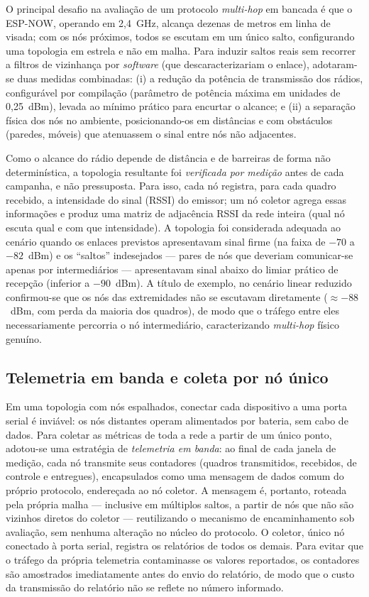 O principal desafio na avaliação de um protocolo \emph{multi-hop} em
bancada é que o ESP-NOW, operando em 2,4~GHz, alcança dezenas de metros
em linha de visada; com os nós próximos, todos se escutam em um único
salto, configurando uma topologia em estrela e não em malha. Para
induzir saltos reais sem recorrer a filtros de vizinhança por
\emph{software} (que descaracterizariam o enlace), adotaram-se duas
medidas combinadas: (i) a redução da potência de transmissão dos rádios,
configurável por compilação (parâmetro de potência máxima em unidades de
0,25~dBm), levada ao mínimo prático para encurtar o alcance; e (ii) a
separação física dos nós no ambiente, posicionando-os em distâncias e
com obstáculos (paredes, móveis) que atenuassem o sinal entre nós não
adjacentes.

Como o alcance do rádio depende de distância e de barreiras de forma não
determinística, a topologia resultante foi \emph{verificada por medição}
antes de cada campanha, e não pressuposta. Para isso, cada nó registra,
para cada quadro recebido, a intensidade do sinal (RSSI) do emissor; um
nó coletor agrega essas informações e produz uma matriz de adjacência
RSSI da rede inteira (qual nó escuta qual e com que intensidade). A
topologia foi considerada adequada ao cenário quando os enlaces previstos
apresentavam sinal firme (na faixa de $-70$ a $-82$~dBm) e os ``saltos''
indesejados --- pares de nós que deveriam comunicar-se apenas por
intermediários --- apresentavam sinal abaixo do limiar prático de
recepção (inferior a $-90$~dBm). A título de exemplo, no cenário linear
reduzido confirmou-se que os nós das extremidades não se escutavam
diretamente ($\approx -88$~dBm, com perda da maioria dos quadros), de
modo que o tráfego entre eles necessariamente percorria o nó
intermediário, caracterizando \emph{multi-hop} físico genuíno.

\subsection{Telemetria em banda e coleta por nó único}\label{telemetria-em-banda}

Em uma topologia com nós espalhados, conectar cada dispositivo a uma
porta serial é inviável: os nós distantes operam alimentados por
bateria, sem cabo de dados. Para coletar as métricas de toda a rede a
partir de um único ponto, adotou-se uma estratégia de \emph{telemetria
em banda}: ao final de cada janela de medição, cada nó transmite seus
contadores (quadros transmitidos, recebidos, de controle e entregues),
encapsulados como uma mensagem de dados comum do próprio protocolo,
endereçada ao nó coletor. A mensagem é, portanto, roteada pela própria
malha --- inclusive em múltiplos saltos, a partir de nós que não são
vizinhos diretos do coletor --- reutilizando o mecanismo de
encaminhamento sob avaliação, sem nenhuma alteração no núcleo do
protocolo. O coletor, único nó conectado à porta serial, registra os
relatórios de todos os demais. Para evitar que o tráfego da própria
telemetria contaminasse os valores reportados, os contadores são
amostrados imediatamente antes do envio do relatório, de modo que o
custo da transmissão do relatório não se reflete no número informado.


